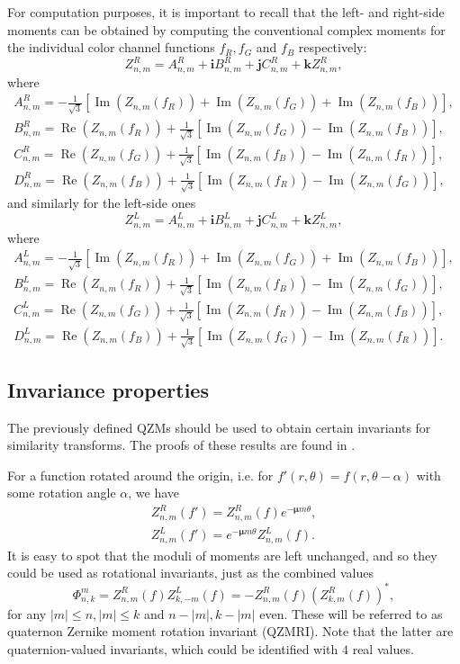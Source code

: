 \documentclass[12pt]{article}
\newcommand{\qi}{\textbf{i}}
\newcommand{\qj}{\textbf{j}}
\newcommand{\qk}{\textbf{k}}
\newcommand{\qmu}{\boldsymbol{\mu}}
\DeclareMathOperator{\rp}{Re}
\DeclareMathOperator{\ip}{Im}
\begin{document}
For computation purposes, it is important to recall \cite{ChenOriginal} that the left- and right-side moments can be obtained by computing the conventional complex moments for the individual color channel functions $f_R, f_G$ and $f_B$ respectively:
\[
	Z_{n,m}^R = A_{n,m}^R + \qi B_{n,m}^R + \qj C_{n,m}^R + \qk Z_{n,m}^R,
\]
where
\[
\begin{gathered}
	A_{n,m}^R = -\frac{1}{\sqrt{3}} \left[ \ip(Z_{n,m}(f_R)) + \ip(Z_{n,m}(f_G)) + \ip(Z_{n,m}(f_B)) \right], \\
	B_{n,m}^R = \rp(Z_{n,m}(f_R)) + \frac{1}{\sqrt{3}} \left[ \ip(Z_{n,m}(f_G)) - \ip(Z_{n,m}(f_B)) \right], \\
	C_{n,m}^R = \rp(Z_{n,m}(f_G)) + \frac{1}{\sqrt{3}} \left[ \ip(Z_{n,m}(f_B)) - \ip(Z_{n,m}(f_R)) \right], \\
	D_{n,m}^R = \rp(Z_{n,m}(f_B)) + \frac{1}{\sqrt{3}} \left[ \ip(Z_{n,m}(f_R)) - \ip(Z_{n,m}(f_G)) \right],
\end{gathered}
\]
and similarly for the left-side ones
\[
	Z_{n,m}^L = A_{n,m}^L + \qi B_{n,m}^L + \qj C_{n,m}^L + \qk Z_{n,m}^L,
\]
where
\[
\begin{gathered}
	A_{n,m}^L = -\frac{1}{\sqrt{3}} \left[ \ip(Z_{n,m}(f_R)) + \ip(Z_{n,m}(f_G)) + \ip(Z_{n,m}(f_B)) \right], \\
	B_{n,m}^L = \rp(Z_{n,m}(f_R)) + \frac{1}{\sqrt{3}} \left[ \ip(Z_{n,m}(f_B)) - \ip(Z_{n,m}(f_G)) \right], \\
	C_{n,m}^L = \rp(Z_{n,m}(f_G)) + \frac{1}{\sqrt{3}} \left[ \ip(Z_{n,m}(f_R)) - \ip(Z_{n,m}(f_B)) \right], \\
	D_{n,m}^L = \rp(Z_{n,m}(f_B)) + \frac{1}{\sqrt{3}} \left[ \ip(Z_{n,m}(f_G)) - \ip(Z_{n,m}(f_R)) \right].
\end{gathered}
\]

\subsection{Invariance properties}

The previously defined QZMs should be used to obtain certain invariants for similarity transforms. The proofs of these results are found in \cite{ChenOriginal}.

For a function rotated around the origin, i.e. for $f' (r,\theta) = f(r,\theta-\alpha)$ with some rotation angle $\alpha$, we have
\[
\begin{gathered}
	Z_{n,m}^R(f') = Z_{n,m}^R(f) e^{-\qmu m\theta}, \\ 
	Z_{n,m}^L(f') = e^{-\qmu m\theta} Z_{n,m}^L(f).
\end{gathered}
\]
It is easy to spot that the moduli of moments are left unchanged, and so they could be used as rotational invariants, just as the combined values
\[
	\Phi_{n,k}^m = Z_{n,m}^R(f)Z_{k,-m}^L(f) = -Z_{n,m}^R(f)(Z_{k,m}^R(f))^*,
\]
for any $|m|\leq n, |m|\leq k$ and $n - |m|, k-|m|$ even. These will be referred to as quaternon Zernike moment rotation invariant (QZMRI). Note that the latter are quaternion-valued invariants, which could be identified with $4$ real values.
\end{document}
